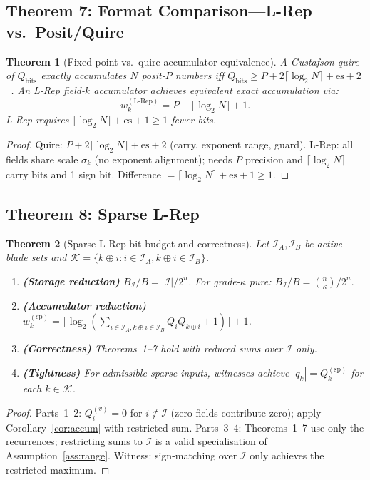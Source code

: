 \documentclass[11pt,a4paper]{article}
\theoremstyle{definition}
\theoremstyle{plain}
\newtheorem{theorem}{Theorem}[section]
\theoremstyle{remark}
\begin{document}
\subsection{Theorem 7: Format Comparison---L-Rep vs.\ Posit/Quire}
\label{sec:format}

\begin{theorem}[Fixed-point vs.\ quire accumulator equivalence]
\label{thm:format}
A Gustafson quire of $Q_\mathrm{bits}$ exactly accumulates $N$
posit-$P$ numbers iff $Q_\mathrm{bits}\ge P+2\lceil\log_2 N\rceil+\mathrm{es}+2$~\cite{gustafson2017}.
An L-Rep field-$k$ accumulator achieves equivalent exact accumulation via:
\begin{equation}
  w_k^{(\mathrm{L\text{-}Rep})} = P+\lceil\log_2 N\rceil+1.
\end{equation}
L-Rep requires $\lceil\log_2 N\rceil+\mathrm{es}+1\ge1$ fewer bits.
\end{theorem}
\begin{proof}
Quire: $P+2\lceil\log_2 N\rceil+\mathrm{es}+2$ (carry, exponent range, guard).
L-Rep: all fields share scale $\sigma_k$ (no exponent alignment); needs
$P$ precision and $\lceil\log_2 N\rceil$ carry bits and 1 sign bit.
Difference $=\lceil\log_2 N\rceil+\mathrm{es}+1\ge1$.
\end{proof}

\subsection{Theorem 8: Sparse L-Rep}
\label{sec:sparse}

\begin{theorem}[Sparse L-Rep bit budget and correctness]
\label{thm:sparse}
Let $\mathcal{I}_A,\mathcal{I}_B$ be active blade sets and
$\mathcal{K}=\{k\oplus i : i\in\mathcal{I}_A, k\oplus i\in\mathcal{I}_B\}$.
\begin{enumerate}
  \item \textbf{(Storage reduction)}
        $B_\mathcal{I}/B = |\mathcal{I}|/2^n$.
        For grade-$\kappa$ pure: $B_\mathcal{I}/B=\binom{n}{\kappa}/2^n$.
  \item \textbf{(Accumulator reduction)}
        $w_k^{(\mathrm{sp})} = \lceil\log_2(\sum_{i\in\mathcal{I}_A,k\oplus i\in\mathcal{I}_B}
        Q_iQ_{k\oplus i}+1)\rceil+1$.
  \item \textbf{(Correctness)} Theorems~1--7 hold with reduced sums
        over $\mathcal{I}$ only.
  \item \textbf{(Tightness)} For admissible sparse inputs, witnesses
        achieve $|q_k|=Q_k^{(\mathrm{sp})}$ for each $k\in\mathcal{K}$.
\end{enumerate}
\end{theorem}
\begin{proof}
Parts~1--2: $Q_i^{(v)}=0$ for $i\notin\mathcal{I}$ (zero fields contribute zero);
apply Corollary~\ref{cor:accum} with restricted sum.
Parts~3--4: Theorems~1--7 use only the recurrences; restricting sums
to $\mathcal{I}$ is a valid specialisation of Assumption~\ref{ass:range}.
Witness: sign-matching over $\mathcal{I}$ only achieves the restricted maximum.
\end{proof}
\end{document}
